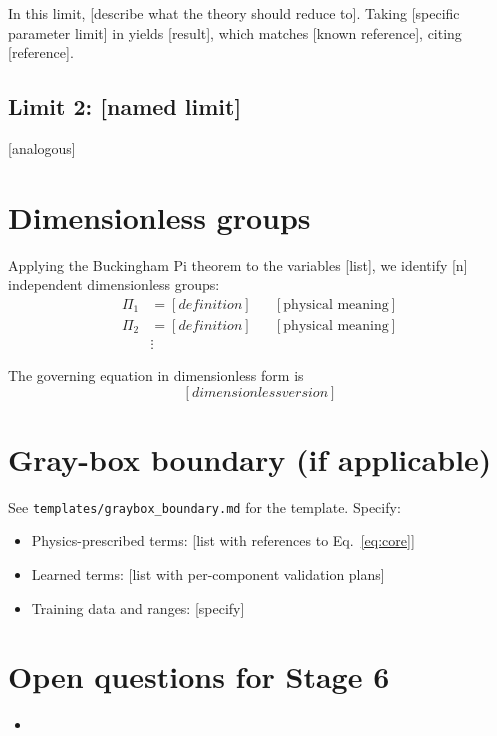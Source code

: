 \documentclass[11pt]{article}
\begin{document}
In this limit, [describe what the theory should reduce to]. Taking [specific parameter limit] in  yields [result], which matches [known reference], citing [reference]. \checkmark

\subsection{Limit 2: [named limit]}

[analogous]

\section{Dimensionless groups}
\label{sec:pi}

Applying the Buckingham Pi theorem to the variables [list], we identify [n] independent dimensionless groups:
\begin{align}
    \Pi_1 &= [definition] && [\text{physical meaning}] \\
    \Pi_2 &= [definition] && [\text{physical meaning}] \\
    &\vdots
\end{align}

The governing equation  in dimensionless form is
\begin{equation}
    \label{eq:core-dimensionless}
    [dimensionless version]
\end{equation}

\section{Gray-box boundary (if applicable)}
\label{sec:graybox}

See \texttt{templates/graybox\_boundary.md} for the template. Specify:
\begin{itemize}
    \item Physics-prescribed terms: [list with references to Eq.~\ref{eq:core}]
    \item Learned terms: [list with per-component validation plans]
    \item Training data and ranges: [specify]
\end{itemize}

\section{Open questions for Stage 6}
\label{sec:open}

\begin{itemize}
    \item [question the numerical prototype must resolve]
\end{itemize}
\end{document}
